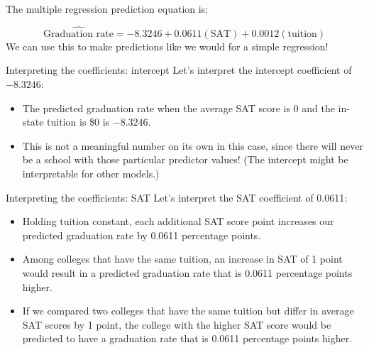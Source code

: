 \documentclass{beamer}\usepackage[]{graphicx}\usepackage[]{color}
\newenvironment{knitrout}{}{} %
\begin{document}
\begin{darkframes}
    \begin{frame}
      The multiple regression prediction equation is:

      \[
        \widehat{\text{Graduation rate}} =
          -8.3246 +
          0.0611(\text{SAT})
          + 0.0012(\text{tuition})
      \]
      \pause
      We can use this to make predictions like we would for a simple regression!
    \end{frame}

    \begin{frame}[fragile]
\begin{knitrout}


\end{knitrout}
    \end{frame}

    \begin{frame}[fragile]
\begin{knitrout}


\end{knitrout}
    \end{frame}

    \begin{frame}{Interpreting the coefficients: intercept}
      Let's interpret the intercept coefficient of $-8.3246$:
      \begin{itemize}[<+->]
        \item The predicted graduation rate when the average SAT score is 0 and the in-state tuition is \$0 is $-8.3246$.
        \item This is not a meaningful number on its own in this case, since there will never be a school with those particular predictor values! (The intercept might be interpretable for other models.)
      \end{itemize}
    \end{frame}

    \begin{frame}{Interpreting the coefficients: SAT}
      Let's interpret the SAT coefficient of 0.0611:
      \begin{itemize}[<+->]
        \item \alert{Holding tuition constant}, each additional SAT score point  increases our predicted graduation rate by 0.0611 percentage points.
        \item \alert{Among colleges that have the same tuition}, an increase in SAT of 1 point would result in a predicted graduation rate that is 0.0611 percentage points higher.
        \item \alert{If we compared two colleges that have the same tuition but differ in average SAT scores by 1 point}, the college with the higher SAT score would be predicted to have a graduation rate that is 0.0611 percentage points higher.
      \end{itemize}
    \end{frame}


\end{darkframes}
\end{document}
